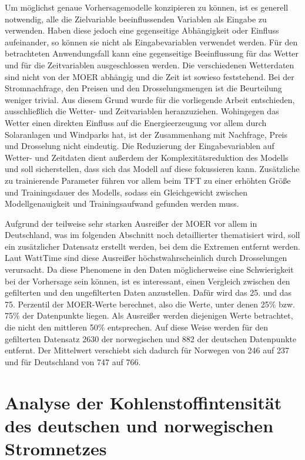 Um möglichst genaue Vorhersagemodelle konzipieren zu können, ist es generell notwendig, alle die Zielvariable beeinflussenden Variablen als Eingabe zu verwenden.
Haben diese jedoch eine gegenseitige Abhängigkeit oder Einfluss aufeinander, so können sie nicht als Eingabevariablen verwendet werden.
Für den betrachteten Anwendungsfall kann eine gegenseitige Beeinflussung für das Wetter und für die Zeitvariablen ausgeschlossen werden.
Die verschiedenen Wetterdaten sind nicht von der \ac{MOER} abhängig und die Zeit ist sowieso feststehend.
Bei der Stromnachfrage, den Preisen und den Drosselungsmengen ist die Beurteilung weniger trivial.
Aus diesem Grund wurde für die vorliegende Arbeit entschieden, ausschließlich die Wetter- und Zeitvariablen heranzuziehen.
Wohingegen das Wetter einen direkten Einfluss auf die Energieerzeugung vor allem durch Solaranlagen und Windparks hat, ist der Zusammenhang mit Nachfrage, Preis und Drosselung nicht eindeutig.
Die Reduzierung der Eingabevariablen auf Wetter- und Zeitdaten dient außerdem der Komplexitätsreduktion des Modells und soll sicherstellen, dass sich das Modell auf diese fokussieren kann.
Zusätzliche zu trainierende Parameter führen vor allem beim \ac{TFT} zu einer erhöhten Größe und Trainingsdauer des Modells, sodass ein Gleichgewicht zwischen Modellgenauigkeit und Trainingsaufwand gefunden werden muss.

Aufgrund der teilweise sehr starken Ausreißer der \ac{MOER} vor allem in Deutschland, was im folgenden Abschnitt noch detaillierter thematisiert wird, soll ein zusätzlicher Datensatz erstellt werden, bei dem die Extremen entfernt werden.
Laut WattTime sind diese Ausreißer höchstwahrscheinlich durch Drosselungen verursacht\cite{WattTime.2022}.
Da diese Phenomene in den Daten möglicherweise eine Schwierigkeit bei der Vorhersage sein können, ist es interessant, einen Vergleich zwischen den gefilterten und den ungefilterten Daten anzustellen.
Dafür wird das 25. und das 75. Perzentil der \ac{MOER}-Werte berechnet, also die Werte, unter denen 25\% bzw. 75\% der Datenpunkte liegen.
Als Ausreißer werden diejenigen Werte betrachtet, die nicht den mittleren 50\% entsprechen.
Auf diese Weise werden für den gefilterten Datensatz 2630 der norwegischen und 882 der deutschen Datenpunkte entfernt.
Der Mittelwert verschiebt sich dadurch für Norwegen von 246 auf 237 und für Deutschland von 747 auf 766.

\section{Analyse der Kohlenstoffintensität des deutschen und norwegischen Stromnetzes}\label{CAP:ci-analysis}

